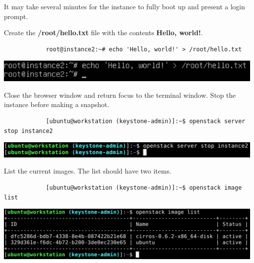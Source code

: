 \documentclass[letterpaper, 12pt]{article}
\begin{document}
\begin{enumerate}
    \begin{notebox}
        It may take several minutes for the instance to fully boot up and present a login prompt.
    \end{notebox}

    \begin{labstep}
        Create the \textbf{/root/hello.txt} file with the contents \textbf{Hello, world!}.
        \begin{lstlisting}
            root@instance2:~# echo 'Hello, world!' > /root/hello.txt
        \end{lstlisting}

        \begin{center}
            \includegraphics[width=\linewidth]{images/part2/step7.png}
        \end{center}
    \end{labstep}

    \begin{labstep}
        Close the browser window and return focus to the terminal window.
        Stop the instance before making a snapshot.
        \begin{lstlisting}
            [ubuntu@workstation (keystone-admin)]:~$ openstack server stop instance2
        \end{lstlisting}

        \begin{center}
            \includegraphics[width=\linewidth]{images/part2/step8.png}
        \end{center}
    \end{labstep}

    \begin{labstep}
        List the current images.
        The list should have two items.
        \begin{lstlisting}
            [ubuntu@workstation (keystone-admin)]:~$ openstack image list
        \end{lstlisting}

        \begin{center}
            \includegraphics[width=\linewidth]{images/part2/step9.png}
        \end{center}
    \end{labstep}


\end{enumerate}
\end{document}
